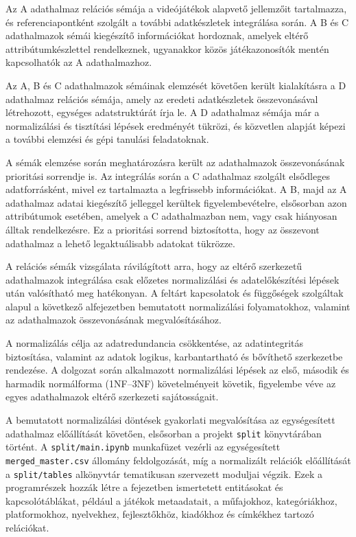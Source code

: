 Az A adathalmaz relációs sémája a videójátékok alapvető jellemzőit tartalmazza, és referenciapontként szolgált a további adatkészletek integrálása során. A B és C adathalmazok sémái kiegészítő információkat hordoznak, amelyek eltérő attribútumkészlettel rendelkeznek, ugyanakkor közös játékazonosítók mentén kapcsolhatók az A adathalmazhoz.

Az A, B és C adathalmazok sémáinak elemzését követően került kialakításra a D adathalmaz relációs sémája, amely az eredeti adatkészletek összevonásával létrehozott, egységes adatstruktúrát írja le. A D adathalmaz sémája már a normalizálási és tisztítási lépések eredményét tükrözi, és közvetlen alapját képezi a további elemzési és gépi tanulási feladatoknak.

A sémák elemzése során meghatározásra került az adathalmazok összevonásának prioritási sorrendje is. Az integrálás során a C adathalmaz szolgált elsődleges adatforrásként, mivel ez tartalmazta a legfrissebb információkat. A B, majd az A adathalmaz adatai kiegészítő jelleggel kerültek figyelembevételre, elsősorban azon attribútumok esetében, amelyek a C adathalmazban nem, vagy csak hiányosan álltak rendelkezésre. Ez a prioritási sorrend biztosította, hogy az összevont adathalmaz a lehető legaktuálisabb adatokat tükrözze.

A relációs sémák vizsgálata rávilágított arra, hogy az eltérő szerkezetű adathalmazok integrálása csak előzetes normalizálási és adatelőkészítési lépések után valósítható meg hatékonyan. A feltárt kapcsolatok és függőségek szolgáltak alapul a következő alfejezetben bemutatott normalizálási folyamatokhoz, valamint az adathalmazok összevonásának megvalósításához.


A normalizálás célja az adatredundancia csökkentése, az adatintegritás biztosítása, valamint az adatok logikus, karbantartható és bővíthető szerkezetbe rendezése. A dolgozat során alkalmazott normalizálási lépések az első, második és harmadik normálforma (1NF–3NF) követelményeit követik, figyelembe véve az egyes adathalmazok eltérő szerkezeti sajátosságait.

A bemutatott normalizálási döntések gyakorlati megvalósítása az
egységesített \\
adathalmaz előállítását követően, elsősorban a projekt
\texttt{split} könyvtárában történt. A \texttt{split/main.ipynb}
munkafüzet vezérli az egységesített \texttt{merged\_master.csv} állomány
feldolgozását, míg a normalizált relációk előállítását a
\texttt{split/tables} alkönyvtár tematikusan szervezett moduljai végzik.
Ezek a programrészek hozzák létre a fejezetben ismertetett entitásokat és
kapcsolótáblákat, például a játékok metaadatait, a műfajokhoz,
kategóriákhoz, platformokhoz, nyelvekhez, fejlesztőkhöz, kiadókhoz és
címkékhez tartozó relációkat.

